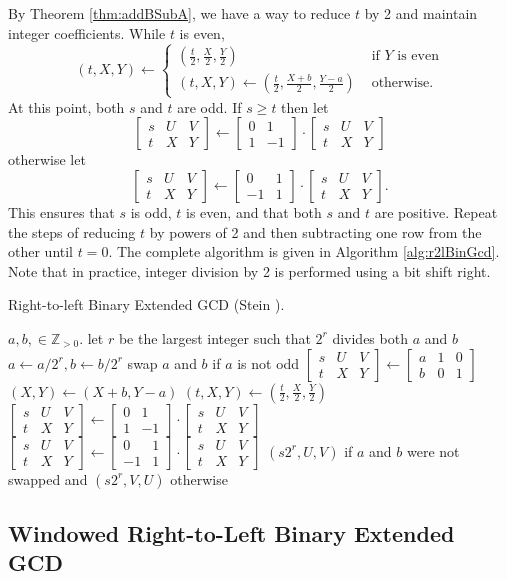 \documentclass{ucalgthes1}
\theoremstyle{definition}
\newcommand{\ZZgtz}{\mathbb{Z}_{>0}}
\newcommand{\matrixtt}[4]{\left[ \begin{array}{rr} #1 & #2 \\ #3 & #4 \end{array} \right]}
\newcommand{\matrixThreeTwo}[6]{\left[ \begin{array}{rrr} #1 & #2 & #3 \\ #4 & #5 & #6 \end{array} \right]}
\begin{document}
By Theorem \ref{thm:addBSubA}, we have a way to reduce $t$ by 2 and maintain integer coefficients.  While $t$ is even, 
\[
	(t, X, Y) \gets \begin{cases}
		\left( \frac{t}{2}, \frac{X}{2}, \frac{Y}{2} \right) &
			\textrm{ if $Y$ is even} \\
		(t, X, Y) \gets \left( \frac{t}{2}, \frac{X+b}{2}, \frac{Y-a}{2} \right) & 
			\textrm{ otherwise.}
	\end{cases}
\]
At this point, both $s$ and $t$ are odd.  If $s \ge t$ then let
\[
	\matrixThreeTwo{s}{U}{V}{t}{X}{Y} \gets \matrixtt{0}{1}{1}{-1} \cdot \matrixThreeTwo{s}{U}{V}{t}{X}{Y}
\]
otherwise let
\[
	\matrixThreeTwo{s}{U}{V}{t}{X}{Y} \gets \matrixtt{0}{1}{-1}{1} \cdot \matrixThreeTwo{s}{U}{V}{t}{X}{Y}.
\]
This ensures that $s$ is odd, $t$ is even, and that both $s$ and $t$ are positive.  Repeat the steps of reducing $t$ by powers of 2 and then subtracting one row from the other until $t=0$.  The complete algorithm is given in Algorithm \ref{alg:r2lBinGcd}.  Note that in practice, integer division by 2 is performed using a bit shift right.

\begin{algorithm}[htb]
\caption{Right-to-left Binary Extended GCD (Stein \cite{Stein1967}).}
\label{alg:r2lBinGcd}
\begin{algorithmic}[1]
\Require $a,b, \in \ZZgtz$.
\State let $r$ be the largest integer such that $2^r$ divides both $a$ and $b$
\State $a \gets a / 2^r, b \gets b / 2^r$
\State swap $a$ and $b$ if $a$ is not odd
\State $\matrixThreeTwo{s}{U}{V}{t}{X}{Y} \gets \matrixThreeTwo{a}{1}{0}{b}{0}{1}$
			\State $(X, Y) \gets (X+b, Y-a)$
		\EndIf
		\State $(t, X, Y) \gets \left( \frac{t}{2}, \frac{X}{2}, \frac{Y}{2} \right)$
	\EndWhile
		\State $\matrixThreeTwo{s}{U}{V}{t}{X}{Y} \gets \matrixtt{0}{1}{1}{-1} \cdot \matrixThreeTwo{s}{U}{V}{t}{X}{Y}$
	\Else
		\State $\matrixThreeTwo{s}{U}{V}{t}{X}{Y} \gets \matrixtt{0}{1}{-1}{1} \cdot \matrixThreeTwo{s}{U}{V}{t}{X}{Y}$
	\EndIf
\EndWhile
\State \Return $(s2^r, U, V)$ if $a$ and $b$ were not swapped and $(s2^r, V, U)$ otherwise
\end{algorithmic}
\end{algorithm}


\subsection{Windowed Right-to-Left Binary Extended GCD}
\label{subsec:gcdR2LWindowed}
\end{document}

